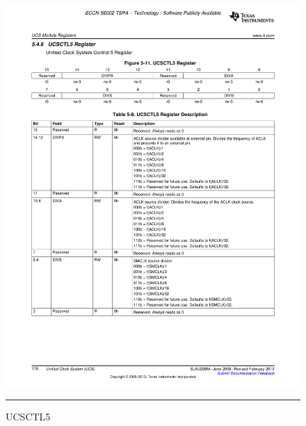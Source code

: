 \pagebreak
\begin{figure}[H]
  \centering
  \includegraphics [angle=0, width=16cm]{./Figures/Chap6_Horloges/UCSCTL5.pdf}
  \rule{35em}{0.5pt}
  \caption{UCSCTL5}
  \label{fig:UCSCTL5}
\end{figure}

